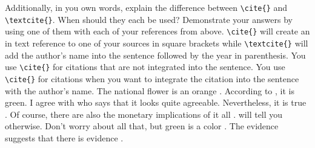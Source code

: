 \documentclass[10pt,twocolumn]{article}
\begin{document}
Additionally, in you own words, explain the difference between \texttt{{\textbackslash}cite\{\}} and \texttt{{\textbackslash}textcite\{\}}. When should they each be used? Demonstrate your answers by using one of them with each of your references from above.\newline\newline
\texttt{{\textbackslash}cite\{\}} will create an in text reference to one of your sources in square brackets while \texttt{{\textbackslash}textcite\{\}} will add the author's name into the sentence followed by the year in parenthesis. You use \texttt{{\textbackslash}cite\{\}} for citations that are not integrated into the sentence. You use \texttt{{\textbackslash}cite\{\}} for citations when you want to integrate the citation into the sentence with the author's name. \newline\newline
The national flower is an orange \cite{JournalArticle}. According to \textcite{Book}, it is green. I agree with \textcite{PHDThesis} who says that it looks quite agreeable. Nevertheless, it is true \cite{JavaDocumentation}. Of course, there are also the monetary implications of it all \cite{NewspaperArticle}. \textcite{BookChapter} will tell you otherwise. Don't worry about all that, but green is a color \cite{ConferenceArticle}. The evidence suggests that there is evidence \cite{YoutubeVideo}. 

\printbibliography
\end{document}
